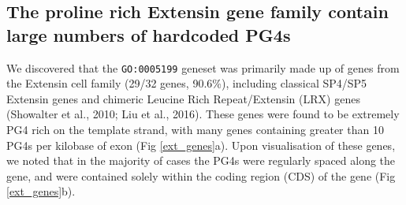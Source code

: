\documentclass[12pt,a4paper,]{report}
\begin{document}
\hypertarget{the-proline-rich-extensin-gene-family-contain-large-numbers-of-hardcoded-pg4s}{%
\subsection{The proline rich Extensin gene family contain large numbers
of hardcoded
PG4s}\label{the-proline-rich-extensin-gene-family-contain-large-numbers-of-hardcoded-pg4s}}

\label{ssec:extensin_hardcoded}

We discovered that the \texttt{GO:0005199} geneset was primarily made up
of genes from the Extensin cell family (29/32 genes, 90.6\%), including
classical SP4/SP5 Extensin genes and chimeric Leucine Rich
Repeat/Extensin (LRX) genes (Showalter et al., 2010; Liu et al., 2016).
These genes were found to be extremely PG4 rich on the template strand,
with many genes containing greater than 10 PG4s per kilobase of exon
(Fig \ref{ext_genes}a). Upon visualisation of these genes, we noted that
in the majority of cases the PG4s were regularly spaced along the gene,
and were contained solely within the coding region (CDS) of the gene
(Fig \ref{ext_genes}b).

\newpage
\end{document}
